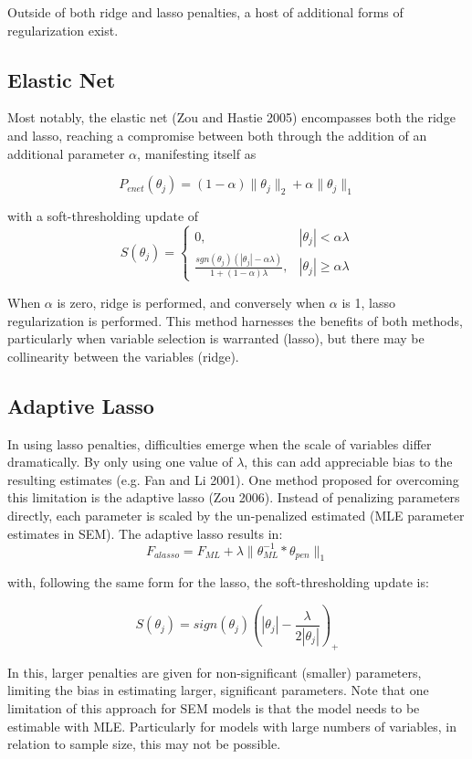 Outside of both ridge and lasso penalties, a host of additional forms of
regularization exist.

\subsection{Elastic Net}\label{elastic-net}

Most notably, the elastic net (Zou and Hastie 2005) encompasses both the
ridge and lasso, reaching a compromise between both through the addition
of an additional parameter \(\alpha\), manifesting itself as

\[
P_{enet}(\theta_{j}) = (1-\alpha)\| \theta_{j} \|_{2} + \alpha\| \theta_{j} \|_{1}
\]

with a soft-thresholding update of \[
S(\theta_{j})= 
\begin{cases}
0,&  |\theta_{j}| < \alpha\lambda\\
\frac{sgn(\theta_{j})(|\theta_{j}|-\alpha\lambda)}{1+(1-\alpha)\lambda},              & |\theta_{j}|\geq\alpha\lambda
\end{cases}
\]

When \(\alpha\) is zero, ridge is performed, and conversely when
\(\alpha\) is 1, lasso regularization is performed. This method
harnesses the benefits of both methods, particularly when variable
selection is warranted (lasso), but there may be collinearity between
the variables (ridge).

\subsection{Adaptive Lasso}\label{adaptive-lasso}

In using lasso penalties, difficulties emerge when the scale of
variables differ dramatically. By only using one value of \(\lambda\),
this can add appreciable bias to the resulting estimates (e.g. Fan and
Li 2001). One method proposed for overcoming this limitation is the
adaptive lasso (Zou 2006). Instead of penalizing parameters directly,
each parameter is scaled by the un-penalized estimated (MLE parameter
estimates in SEM). The adaptive lasso results in: \[
F_{alasso} = F_{ML} + \lambda \| \theta_{ML}^{-1} * \theta_{pen} \|_{1}
\]

with, following the same form for the lasso, the soft-thresholding
update is:

\[
S(\theta_{j})= sign(\theta_{j})(|\theta_{j}|-\frac{\lambda}{2|\theta_{j}|})_{+}
\]

In this, larger penalties are given for non-significant (smaller)
parameters, limiting the bias in estimating larger, significant
parameters. Note that one limitation of this approach for SEM models is
that the model needs to be estimable with MLE. Particularly for models
with large numbers of variables, in relation to sample size, this may
not be possible.

